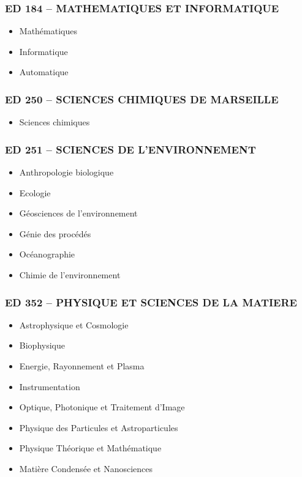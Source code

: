\subsubsection*{ED 184 -- MATHEMATIQUES ET INFORMATIQUE}\label{ed-184-mathematiques-et-informatique}

\begin{itemize}
\item
  Mathématiques
\item
  Informatique
\item
  Automatique
\end{itemize}

\subsubsection*{ED 250 -- SCIENCES CHIMIQUES DE MARSEILLE}\label{ed-250-sciences-chimiques-de-marseille}

\begin{itemize}
\item
  Sciences chimiques
\end{itemize}

\subsubsection*{ED 251 -- SCIENCES DE L'ENVIRONNEMENT}\label{ed-251-sciences-de-lenvironnement}

\begin{itemize}
\item
  Anthropologie biologique
\item
  Ecologie
\item
  Géosciences de l'environnement
\item
  Génie des procédés
\item
  Océanographie
\item
  Chimie de l'environnement
\end{itemize}

\subsubsection*{ED 352 -- PHYSIQUE ET SCIENCES DE LA MATIERE}\label{ed-352-physique-et-sciences-de-la-matiere}

\begin{itemize}
\item
  Astrophysique et Cosmologie
\item
  Biophysique
\item
  Energie, Rayonnement et Plasma
\item
  Instrumentation
\item
  Optique, Photonique et Traitement d'Image
\item
  Physique des Particules et Astroparticules
\item
  Physique Théorique et Mathématique
\item
  Matière Condensée et Nanosciences
\end{itemize}

